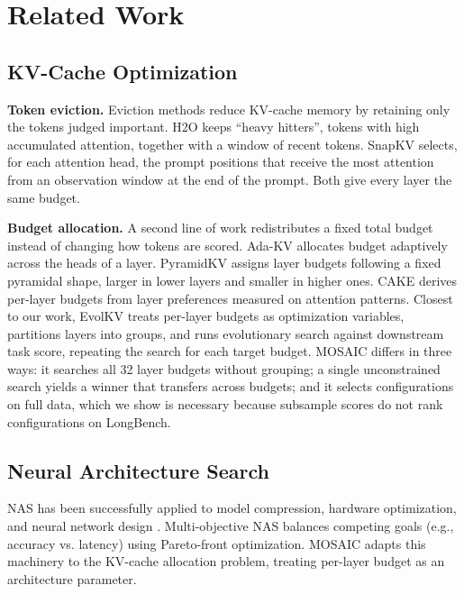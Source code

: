 \documentclass[11pt]{article}
\begin{document}
\section{Related Work}

\subsection{KV-Cache Optimization}

\textbf{Token eviction.} Eviction methods reduce KV-cache memory by retaining only the tokens judged important. H2O \citep{zhang2023h2o} keeps ``heavy hitters'', tokens with high accumulated attention, together with a window of recent tokens. SnapKV \citep{li2024snapkv} selects, for each attention head, the prompt positions that receive the most attention from an observation window at the end of the prompt. Both give every layer the same budget.

\textbf{Budget allocation.} A second line of work redistributes a fixed total budget instead of changing how tokens are scored. Ada-KV \citep{feng2024adakv} allocates budget adaptively across the heads of a layer. PyramidKV \citep{cai2024pyramidkv} assigns layer budgets following a fixed pyramidal shape, larger in lower layers and smaller in higher ones. CAKE \citep{qin2025cake} derives per-layer budgets from layer preferences measured on attention patterns. Closest to our work, EvolKV \citep{yu2025evolkv} treats per-layer budgets as optimization variables, partitions layers into groups, and runs evolutionary search against downstream task score, repeating the search for each target budget. MOSAIC differs in three ways: it searches all 32 layer budgets without grouping; a single unconstrained search yields a winner that transfers across budgets; and it selects configurations on full data, which we show is necessary because subsample scores do not rank configurations on LongBench.

\subsection{Neural Architecture Search}

NAS has been successfully applied to model compression, hardware optimization, and neural network design \citep{elsken2018neural}. Multi-objective NAS balances competing goals (e.g., accuracy vs. latency) using Pareto-front optimization. MOSAIC adapts this machinery to the KV-cache allocation problem, treating per-layer budget as an architecture parameter.
\end{document}
